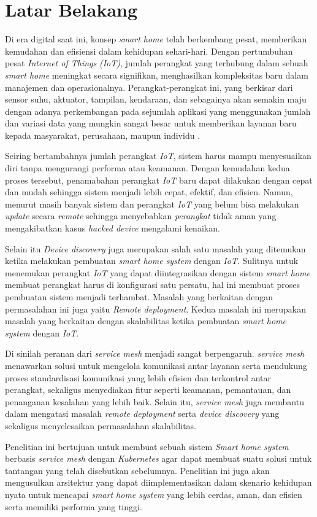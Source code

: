 \section{Latar Belakang}

Di era digital saat ini, konsep \textit{smart home} telah berkembang pesat, memberikan kemudahan dan efisiensi dalam kehidupan sehari-hari. Dengan pertumbuhan pesat \textit{Internet of Things} \textit{(IoT)}, jumlah perangkat yang terhubung dalam sebuah \textit{smart home} meningkat secara signifikan, menghasilkan kompleksitas baru dalam manajemen dan operasionalnya. Perangkat-perangkat ini, yang berkisar dari sensor suhu, aktuator, tampilan, kendaraan, dan sebagainya akan semakin maju dengan adanya perkembangan pada sejumlah aplikasi yang menggunakan jumlah dan variasi data yang mungkin sangat besar untuk memberikan layanan baru kepada masyarakat, perusahaan, maupun individu \parencite{IOTSmartCity}.

Seiring bertambahnya jumlah perangkat \textit{IoT}, sistem harus mampu menyesuaikan diri tanpa mengurangi performa atau keamanan. Dengan kemudahan kedua proses tersebut, penamabahan perangkat \textit{IoT} baru dapat dilakukan dengan cepat dan mudah sehingga sistem menjadi lebih cepat, efektif, dan efisien. Namun, menurut \parencite{RemoteDeployment} masih banyak sistem dan perangkat \textit{IoT} yang belum bisa melakukan \textit{update} secara \textit{remote} sehingga menyebabkan \textit{perangkat} tidak aman yang mengakibatkan kasus \textit{hacked device} mengalami kenaikan.

Selain itu \textit{Device discovery} juga merupakan salah satu masalah yang ditemukan ketika melakukan pembuatan \textit{smart home system} dengan \textit{IoT}. Sulitnya untuk menemukan perangkat \textit{IoT} yang dapat diintegrasikan dengan sistem \textit{smart home} membuat perangkat harus di konfigurasi satu persatu, hal ini membuat proses pembuatan sistem menjadi terhambat. Masalah yang berkaitan dengan permasalahan ini juga yaitu \textit{Remote deployment}. Kedua masalah ini merupakan masalah yang berkaitan dengan skalabilitas ketika pembuatan \textit{smart home system} dengan \textit{IoT}.

Di sinilah peranan dari \textit{service mesh} menjadi sangat berpengaruh. \textit{service mesh} menawarkan solusi untuk mengelola komunikasi antar layanan serta mendukung proses standardisasi komunikasi yang lebih efisien dan terkontrol antar perangkat, sekaligus menyediakan fitur seperti keamanan, pemantauan, dan penanganan kesalahan yang lebih baik. Selain itu, \textit{service mesh} juga membantu dalam mengatasi masalah \textit{remote deployment} serta \textit{device discovery} yang sekaligus menyelesaikan permasalahan skalabilitas.

Penelitian ini bertujuan untuk membuat sebuah sistem \textit{Smart home system} berbasis \textit{service mesh} dengan \textit{Kubernetes} agar dapat membuat suatu solusi untuk tantangan yang telah disebutkan sebelumnya. Penelitian ini juga akan mengusulkan arsitektur yang dapat diimplementasikan dalam skenario kehidupan nyata untuk mencapai \textit{smart home system} yang lebih cerdas, aman, dan efisien serta memiliki performa yang tinggi.